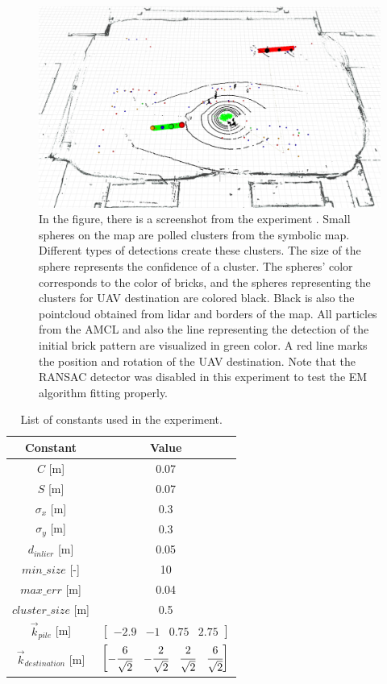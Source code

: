 \begin{figure}[H]
	\centering
	\includegraphics[scale=0.3]{fig/experiment}
	\caption[Experiment results]{In the figure, there is a screenshot from the experiment \footnotemark. Small spheres on the map are polled clusters from the symbolic map. Different types of detections create these clusters. The size of the sphere represents the confidence of a cluster. The spheres' color corresponds to the color of bricks, and the spheres representing the clusters for UAV destination are colored black. Black is also the pointcloud obtained from lidar and borders of the map. All particles from the AMCL and also the line representing the detection of the initial brick pattern are visualized in green color. A red line marks the position and rotation of the UAV destination. Note that the RANSAC detector was disabled in this experiment to test the EM algorithm fitting properly.}
	\label{fig:experiment}
\end{figure}

\begin{table}[H]
	\centering
	\caption{List of constants used in the experiment.}
	\begin{tabular}{cc}
		\toprule
		Constant & Value \\
		\midrule
		$C$ [m] & 0.07   \\ 
		$S$ [m] & 0.07  \\
		$\sigma_x$ [m] & 0.3 \\ 
		$\sigma_y$ [m] & 0.3 \\
		$d_{inlier}$ [m] & 0.05 \\ 
		$min\_size$ [-] & 10 \\
		$max\_err$ [m] & 0.04 \\
		$cluster\_size$ [m] & 0.5 \\
		$\vec{k}_{pile} $ [m] & $\begin{bmatrix}
			-2.9 & -1 & 0.75 & 2.75
		\end{bmatrix}$ \\
		$\vec{k}_{destination}$ [m] &
		$\begin{bmatrix}
			-\cfrac{6}{\sqrt{2}} &  -\cfrac{2}{\sqrt{2}} &  \cfrac{2}{\sqrt{2}} &  \cfrac{6}{\sqrt{2}}
		\end{bmatrix}$ \\
		\bottomrule
	\end{tabular}
	\label{tab:constants}
\end{table}

